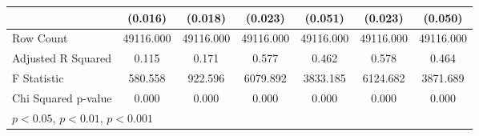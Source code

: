 \begin{table}[htbp]
\begin{tabular}{l*{6}{c}}
                    &     (0.016)         &     (0.018)         &     (0.023)         &     (0.051)         &     (0.023)         &     (0.050)         \\
\hline
Row Count           &   49116.000         &   49116.000         &   49116.000         &   49116.000         &   49116.000         &   49116.000         \\
Adjusted R Squared  &       0.115         &       0.171         &       0.577         &       0.462         &       0.578         &       0.464         \\
F Statistic         &     580.558         &     922.596         &    6079.892         &    3833.185         &    6124.682         &    3871.689         \\
Chi Squared p-value &       0.000         &       0.000         &       0.000         &       0.000         &       0.000         &       0.000         \\
\hline\hline
\multicolumn{7}{l}{\footnotesize \sym{*} \(p<0.05\), \sym{**} \(p<0.01\), \sym{***} \(p<0.001\)}\\
\end{tabular}
\end{table}
